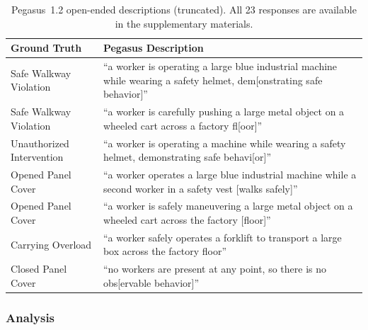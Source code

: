 \documentclass[11pt,a4paper]{article}
\begin{document}
\begin{table}[H]
\centering
\small
\caption{Pegasus~1.2 open-ended descriptions (truncated). All 23 responses are available in the supplementary materials.}
\label{tab:open_ended}
\begin{tabular}{@{}p{3.2cm}p{9.5cm}@{}}
\toprule
\textbf{Ground Truth} & \textbf{Pegasus Description} \\
\midrule
Safe Walkway Violation & ``a worker is operating a large blue industrial machine while wearing a safety helmet, dem[onstrating safe behavior]'' \\
Safe Walkway Violation & ``a worker is carefully pushing a large metal object on a wheeled cart across a factory fl[oor]'' \\
Unauthorized Intervention & ``a worker is operating a machine while wearing a safety helmet, demonstrating safe behavi[or]'' \\
Opened Panel Cover & ``a worker operates a large blue industrial machine while a second worker in a safety vest [walks safely]'' \\
Opened Panel Cover & ``a worker is safely maneuvering a large metal object on a wheeled cart across the factory [floor]'' \\
Carrying Overload & ``a worker safely operates a forklift to transport a large box across the factory floor'' \\
Closed Panel Cover & ``no workers are present at any point, so there is no obs[ervable behavior]'' \\
\bottomrule
\end{tabular}
\end{table}

\subsubsection{Analysis}
\end{document}
